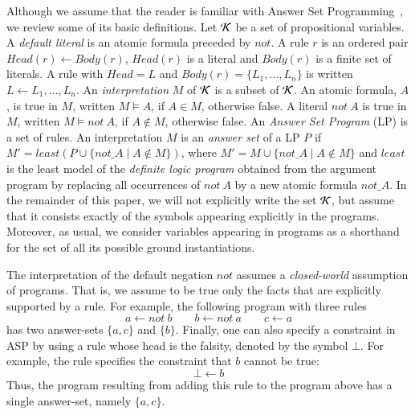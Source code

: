 \documentclass{new_tlp}
\newcommand\dnot{\ensuremath{\mathit{not}}\xspace}
\begin{document}
Although we assume that the reader is familiar with Answer Set Programming~\cite{gelfond90iclp}, we 
review some of its basic definitions. Let $\Kscr$ be a set of propositional 
variables. A \emph{default literal} is an atomic formula preceded by 
\dnot. A rule $r$ is an ordered pair $Head(r) \leftarrow Body(r)$, $Head(r)$ is 
a literal and $Body(r)$ is a finite set of literals. A rule with $Head = L$ and 
$Body(r) = \{L_1, \ldots, L_n\}$ is written $L \leftarrow L_1, \ldots, L_n$.
An \emph{interpretation} $M$ of $\Kscr$ is a subset of $\Kscr$. An atomic formula, $A$,
is true in $M$, written $M \vDash A$, if $A \in M$, otherwise false. A literal $\dnot\ A$
is true in $M$, written $M \vDash \dnot\ A$, if $A \notin M$, otherwise false.
An \emph{Answer Set Program} (LP) is a set of rules. An interpretation $M$
is an \emph{answer set} of a LP $P$ if $M' = least(P \cup \{\dnot\_A \mid A \notin M\} )$, 
where $M' = M \cup \{\dnot\_A \mid A \notin M\}$ and $least$ is the least model 
of the \emph{definite logic program} obtained from the argument program by replacing 
all occurrences of $\dnot\ A$ by a new atomic formula $\dnot\_A$. 
In the remainder
of this paper, we will not explicitly write the set $\Kscr$, but assume that it consists
exactly of the symbols appearing explicitly in the programs. Moreover, as usual, we 
consider variables appearing in programs as a shorthand for the set of all its possible ground 
instantiations.

The interpretation of the default negation $\dnot$ assumes a
\emph{closed-world} assumption of programs. That is, we assume to be true
only the facts that are explicitly supported by a rule. For example, the
following program with three rules
\[
 a \leftarrow \dnot\ b \qquad b \leftarrow \dnot\ a \qquad c \leftarrow a
\]
has two answer-sets $\{a, c\}$ and $\{b\}$. Finally, 
one can also specify a constraint in ASP by using a rule whose head is the falsity, 
denoted by the symbol $\bot$. For example, the rule specifies the constraint
that $b$ cannot be true:
\[ 
\bot \leftarrow b
\]
Thus, the program resulting from adding this rule to the program above has 
a single answer-set, namely $\{a, c\}$.
\end{document}
